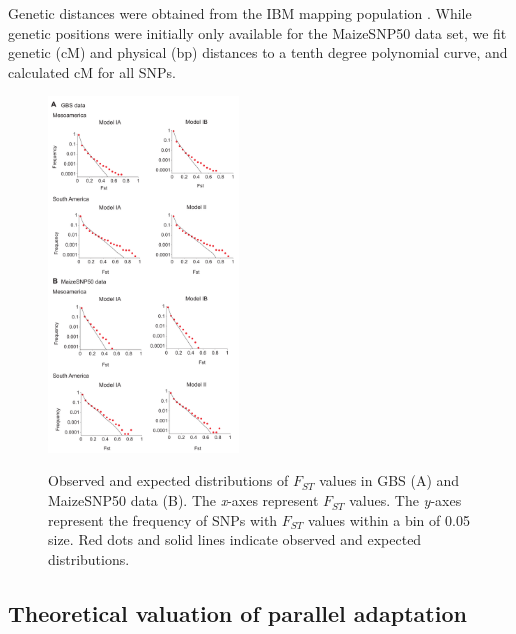Genetic distances were obtained from the IBM mapping population \cite[]{Ganal_2011_22174790}.  
While genetic positions were initially only available for the MaizeSNP50 data set, we fit genetic (cM) and physical (bp) distances to a tenth degree polynomial curve, and calculated cM for all SNPs. 
%
%
 
\begin{figure}[tb]   
  \begin{center}
   \vspace{-0mm}
   \includegraphics[width=0.45\textwidth]{fig/Fig5}
   \renewcommand{\baselinestretch}{0.9}
   \vspace{-3mm}
   \caption{Observed and expected distributions of $F_{ST}$ values in GBS (A) and MaizeSNP50 data (B).  The \emph{x}-axes represent $F_{ST}$ values.  The \emph{y}-axes represent the frequency of SNPs with $F_{ST}$ values within a bin of 0.05 size.  Red dots and solid lines indicate observed and expected distributions. 
   }
\vspace{-6mm}
    \label{FstDist}
  \end{center}
\end{figure}


\subsection*{Theoretical valuation of parallel adaptation }

